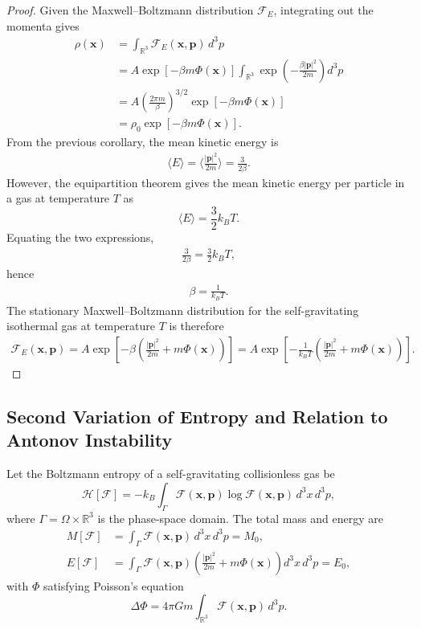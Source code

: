 \documentclass[12pt,a4paper]{article}
\numberwithin{equation}{section}
\begin{document}
\begin{proof}
Given the Maxwell--Boltzmann distribution $\mathcal{F}_{E}$, integrating out the momenta gives
\begin{align}
\rho(\mathbf{x})
&= \int_{\mathbb{R}^{3}} \mathcal{F}_{E}(\mathbf{x},\mathbf{p}) \, d^{3}p \nonumber \\
&= A \exp\!\left[-\beta m \Phi(\mathbf{x})\right] \int_{\mathbb{R}^{3}} \exp\!\left(-\frac{\beta |\mathbf{p}|^{2}}{2m}\right) d^{3}p \nonumber \\
&= A \left(\frac{2\pi m}{\beta}\right)^{3/2} \exp\!\left[-\beta m \Phi(\mathbf{x})\right] \nonumber \\
&= \rho_{0} \exp\!\left[-\beta m \Phi(\mathbf{x})\right].
\end{align}
From the previous corollary, the mean kinetic energy is
\begin{align}
\langle E \rangle = \Big\langle \frac{|\mathbf{p}|^{2}}{2m} \Big\rangle = \frac{3}{2\beta}.
\end{align}
However, the equipartition theorem gives the mean kinetic energy per particle in a gas at temperature $T$ as
\[
\langle E \rangle = \frac{3}{2} k_{B} T.
\]
Equating the two expressions,
\begin{align}
\frac{3}{2\beta} = \frac{3}{2} k_{B} T,
\end{align}
hence
\begin{align}
\beta = \frac{1}{k_{B} T}.
\end{align}
The stationary Maxwell--Boltzmann distribution for the self-gravitating isothermal gas at temperature $T$ is therefore
\begin{align}
\mathcal{F}_{E}(\mathbf{x},\mathbf{p})
= A \exp\!\left[-\beta \left(\frac{|\mathbf{p}|^{2}}{2m} + m \Phi(\mathbf{x})\right)\right]
= A \exp\!\left[-\frac{1}{k_{B} T} \left(\frac{|\mathbf{p}|^{2}}{2m} + m \Phi(\mathbf{x})\right)\right].
\end{align}
\end{proof}
\subsection{Second Variation of Entropy and Relation to Antonov Instability}

Let the Boltzmann entropy of a self-gravitating collisionless gas be
\begin{equation}
\mathcal{H}[\mathcal{F}] = - k_B \int_{\Gamma} \mathcal{F}(\mathbf{x}, \mathbf{p}) \log \mathcal{F}(\mathbf{x}, \mathbf{p}) \, d^3x \, d^3p,
\end{equation}
where $\Gamma = \Omega \times \mathbb{R}^3$ is the phase-space domain.
The total mass and energy are
\begin{align}
M[\mathcal{F}] &= \int_{\Gamma} \mathcal{F}(\mathbf{x}, \mathbf{p}) \, d^3x \, d^3p = M_0, \\
E[\mathcal{F}] &= \int_{\Gamma} \mathcal{F}(\mathbf{x}, \mathbf{p}) \left( \frac{|\mathbf{p}|^2}{2m} + m \Phi(\mathbf{x}) \right) d^3x \, d^3p = E_0,
\end{align}
with $\Phi$ satisfying Poisson’s equation
\begin{equation}
\Delta \Phi = 4 \pi G m \int_{\mathbb{R}^3} \mathcal{F}(\mathbf{x}, \mathbf{p}) \, d^3p.
\end{equation}
\end{document}
